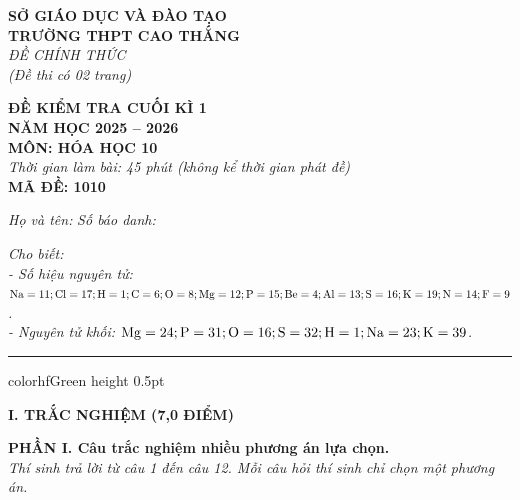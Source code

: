 \documentclass[11pt,a4paper]{article}
\begin{document}
\begin{minipage}[t]{0.48\textwidth}
\textbf{SỞ GIÁO DỤC VÀ ĐÀO TẠO}\\
\textbf{TRƯỜNG THPT CAO THẮNG}\\
\textit{ĐỀ CHÍNH THỨC}\\
\textit{(Đề thi có 02 trang)}
\end{minipage}
\hfill
\begin{minipage}[t]{0.48\textwidth}
\raggedleft
\textbf{\color{hfRed}ĐỀ KIỂM TRA CUỐI KÌ 1}\\
\textbf{NĂM HỌC 2025 -- 2026}\\
\textbf{MÔN: HÓA HỌC 10}\\
\textit{Thời gian làm bài: 45 phút (không kể thời gian phát đề)}\\
\textbf{MÃ ĐỀ: 1010}
\end{minipage}

\vspace{4pt}
\noindent
\textit{Họ và tên:} \dotfill \textit{Số báo danh:} \dotfill

\vspace{3pt}
\noindent
\textit{\footnotesize Cho biết:}\\
\textit{\footnotesize - Số hiệu nguyên tử: $\ce{Na}=11; \ce{Cl}=17; \ce{H}=1; \ce{C}=6; \ce{O}=8; \ce{Mg}=12; \ce{P}=15; \ce{Be}=4; \ce{Al}=13; \ce{S}=16; \ce{K}=19; \ce{N}=14; \ce{F}=9$.}\\
\textit{\footnotesize - Nguyên tử khối: $\ce{Mg}=24; \ce{P}=31; \ce{O}=16; \ce{S}=32; \ce{H}=1; \ce{Na}=23; \ce{K}=39$.}

\vspace{3pt}
\hrule color{hfGreen} height 0.5pt

\vspace{4pt}
\noindent
{\color{mainGreen}\textbf{\Large I. TRẮC NGHIỆM (7,0 ĐIỂM)}}

\vspace{3pt}
\noindent
{\color{mainGreen}\textbf{\large PHẦN I. Câu trắc nghiệm nhiều phương án lựa chọn.}}\\
\textit{\small Thí sinh trả lời từ câu 1 đến câu 12. Mỗi câu hỏi thí sinh chỉ chọn một phương án.}
\vspace{2pt}
\end{document}
